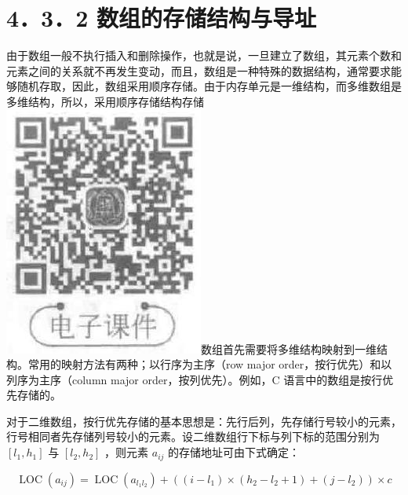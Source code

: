 \documentclass[10pt]{article}
\begin{document}
\section*{4．3．2 数组的存储结构与导址}
由于数组一般不执行插入和删除操作，也就是说，一旦建立了数组，其元素个数和元素之间的关系就不再发生变动，而且，数组是一种特殊的数据结构，通常要求能够随机存取，因此，数组采用顺序存储。由于内存单元是一维结构，而多维数组是多维结构，所以，采用顺序存储结构存储\\
\includegraphics[max width=\textwidth]{2025_06_06_704745ea57b15b2333e5g-121}数组首先需要将多维结构映射到一维结构。常用的映射方法有两种；以行序为主序（row major order，按行优先）和以列序为主序（column major order，按列优先）。例如，C 语言中的数组是按行优先存储的。

对于二维数组，按行优先存储的基本思想是：先行后列，先存储行号较小的元素，行号相同者先存储列号较小的元素。设二维数组行下标与列下标的范围分别为 $\left[l_{1}, h_{1}\right]$ 与 $\left[l_{2}, h_{2}\right]$ ，则元素 $a_{i j}$ 的存储地址可由下式确定：


\begin{equation*}
\operatorname{LOC}\left(a_{i j}\right)=\operatorname{LOC}\left(a_{l_{1} l_{2}}\right)+\left(\left(i-l_{1}\right) \times\left(h_{2}-l_{2}+1\right)+\left(j-l_{2}\right)\right) \times c \tag{4-2}
\end{equation*}
\end{document}
